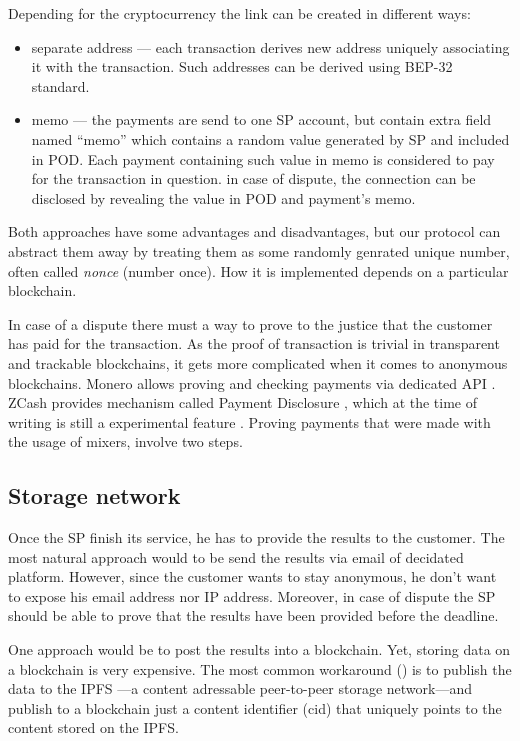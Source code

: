 \documentclass{ieeeaccess}
\begin{document}
Depending for the cryptocurrency the link can be created in different
ways:

\begin{itemize}

\item
  separate address --- each transaction derives new address uniquely
  associating it with the transaction. Such addresses can be derived
  using BEP-32 standard.
\item
  memo --- the payments are send to one SP account, but contain extra
  field named ``memo'' which contains a random value generated by SP and
  included in POD. Each payment containing such value in memo is
  considered to pay for the transaction in question. in case of dispute,
  the connection can be disclosed by revealing the value in POD and
  payment's memo.
\end{itemize}

Both approaches have some advantages and disadvantages, but our protocol
can abstract them away by treating them as some randomly genrated unique
number, often called \textit{nonce} (number once). How it is implemented
depends on a particular blockchain.

In case of a dispute there must a way to prove to the justice that the
customer has paid for the transaction. As the proof of transaction is
trivial in transparent and trackable blockchains, it gets more
complicated when it comes to anonymous blockchains. Monero allows
proving and checking payments via dedicated API \cite{Howtopro46}.
ZCash provides mechanism called Payment Disclosure \cite{AnIntrod25},
which at the time of writing is still a experimental feature
\cite{paymentd11}. Proving payments that were made with the usage of
mixers, involve two steps.

\subsection{Storage network}
Once the SP finish its service, he has to provide the results to the
customer. The most natural approach would to be send the results via
email of decidated platform. However, since the customer wants to stay
anonymous, he don't want to expose his email address nor IP address.
Moreover, in case of dispute the SP should be able to prove that the
results have been provided before the deadline.

One approach would be to post the results into a blockchain. Yet,
storing data on a blockchain is very expensive. The most common
workaround
(\cite{shahid2020blockchain, wang2019auditable, chen2017improved, Usageide95})
is to publish the data to the IPFS \cite{benet2014ipfs}---a content
adressable peer-to-peer storage network---and publish to a blockchain
just a content identifier (cid) that uniquely points to the content
stored on the IPFS.
\end{document}
